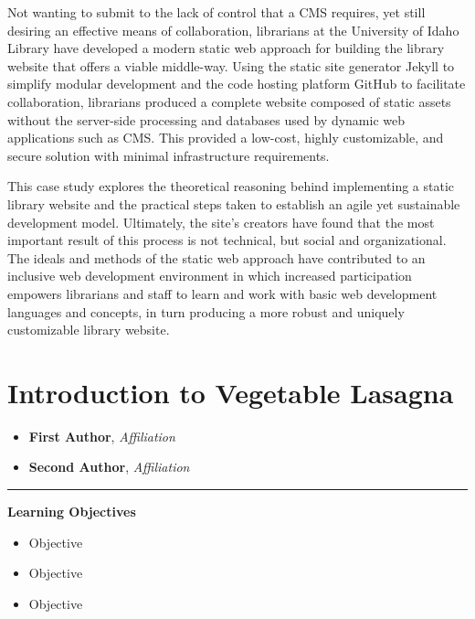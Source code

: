 \documentclass{book}
\providecommand{\tightlist}{%
  \setlength{\itemsep}{0pt}\setlength{\parskip}{0pt}}
\begin{document}
Not wanting to submit to the lack of control that a CMS requires, yet still
desiring an effective means of collaboration, librarians at the University of
Idaho Library have developed a modern static web approach for building the
library website that offers a viable middle-way. Using the static site
generator Jekyll to simplify modular development and the code hosting platform
GitHub to facilitate collaboration, librarians produced a complete website
composed of static assets without the server-side processing and databases
used by dynamic web applications such as CMS. This provided a low-cost, highly
customizable, and secure solution with minimal infrastructure requirements.

This case study explores the theoretical reasoning behind implementing a
static library website and the practical steps taken to establish an agile yet
sustainable development model. Ultimately, the site's creators have found that
the most important result of this process is not technical, but social and
organizational. The ideals and methods of the static web approach have
contributed to an inclusive web development environment in which increased
participation empowers librarians and staff to learn and work with basic web
development languages and concepts, in turn producing a more robust and
uniquely customizable library website.

\hypertarget{introduction-to-vegetable-lasagna}{%
\chapter{Introduction to Vegetable
Lasagna}\label{introduction-to-vegetable-lasagna}}

\begin{itemize}
\tightlist
\item
  \textbf{First Author}, \emph{Affiliation}
\item
  \textbf{Second Author}, \emph{Affiliation}
\end{itemize}

\begin{center}\rule{0.5\linewidth}{0.5pt}\end{center}

\textbf{Learning Objectives}

\begin{itemize}
\tightlist
\item
  Objective
\item
  Objective
\item
  Objective
\end{itemize}
\end{document}
